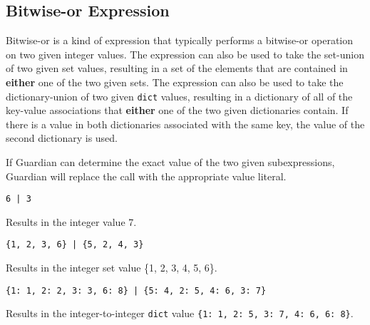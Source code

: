 
\subsection{Bitwise-or Expression}
{
	Bitwise-or is a kind of expression that typically performs
	a bitwise-or operation on two given integer values.
	The expression can also be used to take the set-union
	of two given set values, resulting in a set of the
	elements that are contained in
	\textbf{either} one of the two given sets.
	The expression can also be used to take the
	dictionary-union of two given
	\texttt{dict} values, resulting in a dictionary of
	all of the key-value
	associations that \textbf{either} one of the two given
	dictionaries contain. If there is a value in both dictionaries
	associated with the same key, the value of the second dictionary is used.
	
	If Guardian can determine the exact value of the two given subexpressions,
	Guardian will replace the call with the appropriate value literal.
	
	\begin{itemize}
	{
		\item[] \texttt{6 | 3}
		
			Results in the integer value 7.
		
		\item[] \texttt{\{1, 2, 3, 6\} | \{5, 2, 4, 3\}}
		
			Results in the integer set value \{1, 2, 3, 4, 5, 6\}.
		
		\item[] \texttt{\{1: 1, 2: 2, 3: 3, 6: 8\} | \{5: 4, 2: 5, 4: 6, 3: 7\}}
		
			Results in the integer-to-integer \texttt{dict}
			value \texttt{\{1: 1, 2: 5, 3: 7, 4: 6, 6: 8\}}.
	}
	\end{itemize}
}
